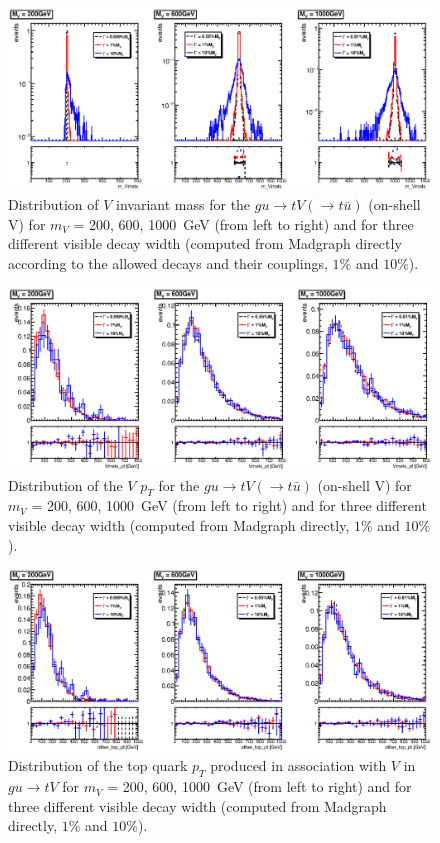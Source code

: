 \begin{figure}[!h!tpd]
	\centering
	\includegraphics[width=1.0\textwidth]{figures/singletop/m_Vmets}
	\caption{
		Distribution of $V$ invariant mass for the $gu\to tV(\to t\bar{u})$ (on-shell V) 
		for $m_V$ = {200, 600, 1000}~GeV (from left to right) and for three different
		visible decay width (computed from Madgraph directly according to the allowed decays and their couplings, $1\%$ and $10\%$).
	}   
	\label{fig:appB:Vmass}
\end{figure}


\begin{figure}[!h!tpd]
	\centering
	\includegraphics[width=1.0\textwidth]{figures/singletop/Vmets_pt}
	\caption{
		Distribution of the $V$ $p_T$ for the $gu\to tV(\to t\bar{u})$ (on-shell V) for $m_V$ = {200, 600, 1000}~GeV (from left to right) and for three different
		visible decay width (computed from Madgraph directly, $1\%$ and $10\%$).
	}
	\label{fig:appB:pTV}
\end{figure}


\begin{figure}[!h!tpd]
	\centering
	\includegraphics[width=1.0\textwidth]{figures/singletop/other_top_pt}
	\caption{
		Distribution of the top quark $p_T$ produced in association with $V$ in $gu\to tV$ for $m_V$ = {200, 600, 1000}~GeV (from left to right) and for three different
		visible decay width (computed from Madgraph directly, $1\%$ and $10\%$).
	}
	\label{fig:appB:pTtop}
\end{figure}

